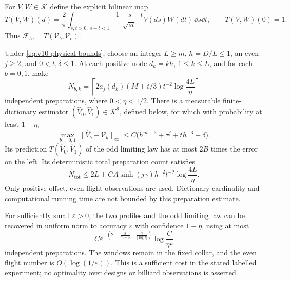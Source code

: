For $V,W\in\mathcal K$ define the explicit bilinear map
\begin{equation}\label{eq:v10-forward-map}
 T(V,W)(d)=\frac2\pi\int_{s,t>0,\ s+t<1}
     \frac{1-s-t}{\sqrt{st}}V(ds)W(dt)\,\dd s\dd t,
 \qquad T(V,W)(0)=1.
\end{equation}
Thus $\mathcal F_{bc}=T(\mathcal V_b,\mathcal V_c)$.

\begin{theorem}
\label{thm:v10-acquisition}
Under \eqref{eq:v10-physical-bounds}, choose an integer $L\ge m$,
$h=D/L\le1$, an even $j\ge2$, and $0<t,\delta\le1$. At each positive
node $d_k=kh$, $1\le k\le L$, and for each $b=0,1$, make
\begin{equation}\label{eq:v10-allocation}
 N_{b,k}=\left\lceil
 2a_j(d_k)(M+t/3)t^{-2}\log\frac{4L}{\eta}
                       \right\rceil
\end{equation}
independent preparations, where $0<\eta<1/2$.
There is a measurable finite-dictionary estimator
$(\widehat V_0,\widehat V_1)\in\mathcal K^2$, defined below, for which
with probability at least $1-\eta$,
\begin{equation}\label{eq:v10-error}
 \max_{b=0,1}\|\widehat V_b-\mathcal V_b\|_\infty
 \le C\bigl(h^{m-3}+\tau^j+t h^{-3}+\delta\bigr).
\end{equation}
Its prediction $T(\widehat V_0,\widehat V_1)$ of the odd limiting
law has at most $2B$ times the error on the left. Its deterministic
total preparation count satisfies
\begin{equation}\label{eq:v10-budget-general}
 N_{\mathrm{tot}}\le 2L+
 C A\sinh(j\gamma)h^{-2}t^{-2}\log\frac{4L}{\eta}.
\end{equation}
Only positive-offset, even-flight observations are used. Dictionary
cardinality and computational running time are not bounded by this
preparation estimate.
\end{theorem}

\begin{corollary}
\label{cor:v10-budget}
For sufficiently small $\varepsilon>0$, the two profiles and the odd
limiting law can be recovered in uniform norm to accuracy
$\varepsilon$ with confidence $1-\eta$, using at most
\begin{equation}\label{eq:v10-budget}
 C\varepsilon^{-\left(2+\frac8{m-3}
                   +\frac{\gamma}{|\log\tau|}\right)}
                        \log\frac{C}{\eta\varepsilon}
\end{equation}
independent preparations. The windows remain in the fixed collar,
and the even flight number is $O(\log(1/\varepsilon))$.
This is a sufficient cost in the stated labelled experiment; no
optimality over designs or billiard observations is asserted.
\end{corollary}

